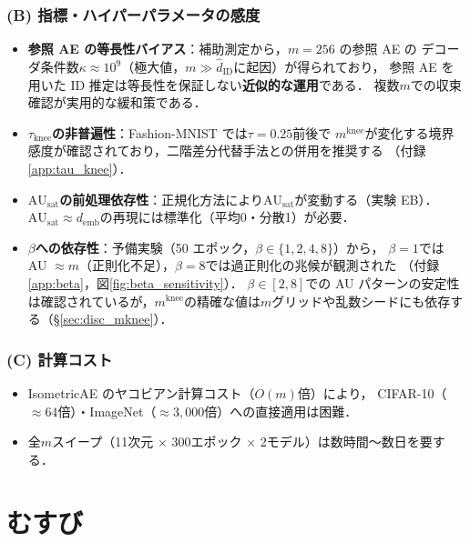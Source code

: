 \documentclass[11pt,a4paper]{jsarticle}
\newcommand{\kap}{\kappa}
\newcommand{\AUsat}{\mathrm{AU}_{\mathrm{sat}}}
\newcommand{\mknee}{m^{\mathrm{knee}}}
\newcommand{\demb}{d_{\mathrm{emb}}}
\begin{document}
\subsubsection*{(B) 指標・ハイパーパラメータの感度}

\begin{itemize}
  \item \textbf{参照 AE の等長性バイアス}：補助測定から，$m = 256$ の参照 AE の
        デコーダ条件数$\kap \approx 10^9$（極大値，$m \gg \hat{d}_\mathrm{ID}$に起因）が得られており，
        参照 AE を用いた ID 推定は等長性を保証しない\textbf{近似的な運用}である．
        複数$m$での収束確認が実用的な緩和策である．
  \item \textbf{$\tau_{\mathrm{knee}}$の非普遍性}：Fashion-MNIST では$\tau = 0.25$前後で
        $\mknee$が変化する境界感度が確認されており，二階差分代替手法との併用を推奨する
        （付録\ref{app:tau_knee}）．
  \item \textbf{$\AUsat$の前処理依存性}：正規化方法により$\AUsat$が変動する（実験 EB）．
        $\AUsat \approx \demb$の再現には標準化（平均0・分散1）が必要．
  \item \textbf{$\beta$への依存性}：予備実験（50 エポック，$\beta \in \{1,2,4,8\}$）から，
        $\beta = 1$では AU $\approx m$（正則化不足），$\beta = 8$では過正則化の兆候が観測された
        （付録\ref{app:beta}，図\ref{fig:beta_sensitivity}）．
        $\beta \in [2, 8]$での AU パターンの安定性は確認されているが，$\mknee$の精確な値は$m$グリッドや乱数シードにも依存する（§\ref{sec:disc_mknee}）．
\end{itemize}

\subsubsection*{(C) 計算コスト}

\begin{itemize}
  \item IsometricAE のヤコビアン計算コスト（$O(m)$倍）により，
        CIFAR-10（$\approx 64$倍）・ImageNet（$\approx 3{,}000$倍）への直接適用は困難．
  \item 全$m$スイープ（11次元 $\times$ 300エポック $\times$ 2モデル）は数時間〜数日を要する．
\end{itemize}

\section{むすび}\label{sec:conclusion}
\end{document}
